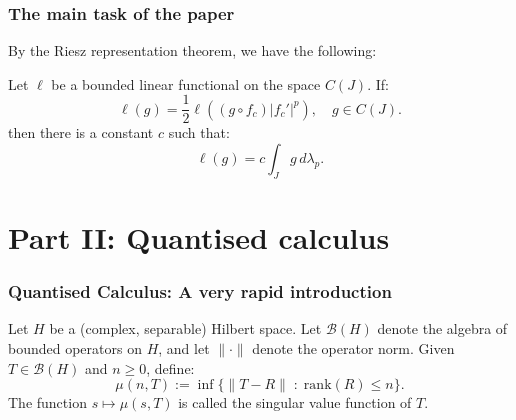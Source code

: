 \documentclass{beamer} %
\theoremstyle{definition} %
\begin{document}
% 
%     

\begin{frame}\frametitle{The main task of the paper}
    By the Riesz representation theorem, we have the following:
    \begin{theorem}
        Let $\ell$ be a bounded linear functional on the space $C(J)$. If:
        \begin{equation*}
            \ell(g) = \frac{1}{2}\ell((g\circ f_c)|f_c'|^p),\quad g \in C(J).
        \end{equation*}
        then there is a constant $c$ such that:
        \begin{equation*}
            \ell(g) = c\int_{J} g\,d\lambda_p.
        \end{equation*}
    \end{theorem}
\end{frame}


\section{Part II: Quantised calculus}

\begin{frame}\frametitle{Quantised Calculus: A very rapid introduction}
    Let $H$ be a (complex, separable) Hilbert space. Let $\mathcal{B}(H)$ denote the algebra
    of bounded operators on $H$, and let $\|\cdot\|$ denote the operator norm. Given $T \in \mathcal{B}(H)$ and $n \geq 0$, define:
    \begin{equation*}
        \mu(n,T) := \inf\{\|T-R\|\;:\;\mathrm{rank}(R) \leq n\}.
    \end{equation*}
    The function $s\mapsto \mu(s,T)$ is called the singular value function of $T$.
\end{frame}
\end{document}
